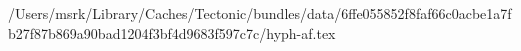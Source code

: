 /Users/msrk/Library/Caches/Tectonic/bundles/data/6ffe055852f8faf66c0acbe1a7fb27f87b869a90bad1204f3bf4d9683f597c7c/hyph-af.tex
